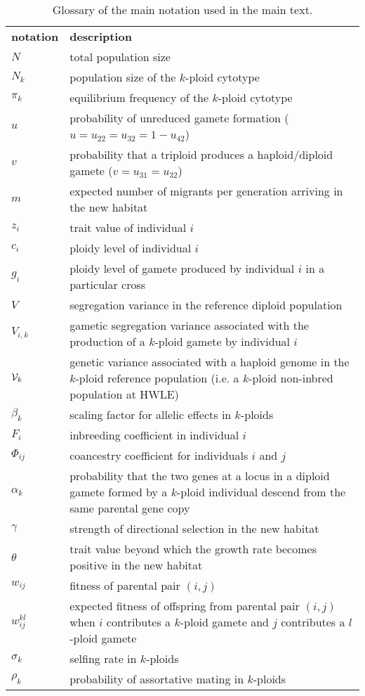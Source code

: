 \documentclass[12pt,a4paper]{article}
\begin{document}
\begin{table}[t]
\caption{Glossary of the main notation used in the main text.
} \label{tbl:glossary}
\centering
\small
\begin{tabularx}{\linewidth}{lX}
\cline{1-2}
\textbf{notation}   & \textbf{description}   \\ \cline{1-2}
$N$ & total population size\\
$N_k$ & population size of the $k$-ploid cytotype \\
$\pi_k$ & equilibrium frequency of the $k$-ploid cytotype \\
$u$ & probability of unreduced gamete formation ($u=u_{22}=u_{32}=1-u_{42}$)\\
$v$ & probability that a triploid produces a haploid/diploid gamete
  ($v=u_{31}=u_{32}$)\\
$m$ & expected number of migrants per generation arriving in the new habitat \\
$z_i$ & trait value of individual $i$ \\
$c_i$ & ploidy level of individual $i$ \\
$g_i$ & ploidy level of gamete produced by individual $i$ in a particular cross\\
$V$ & segregation variance in the reference diploid population \\
$V_{i,k}$ & gametic segregation variance associated with the production of a
  $k$-ploid gamete by individual $i$ \\
$\mathcal{V}_k$ & genetic variance associated with a haploid genome in the $k$-ploid
  reference population (i.e. a $k$-ploid non-inbred population at HWLE) \\
$\beta_{k}$ & scaling factor for allelic effects in $k$-ploids \\
$F_i$ & inbreeding coefficient in individual $i$ \\
$\Phi_{ij}$ & coancestry coefficient for individuals $i$ and $j$ \\
$\alpha_k$ & probability that the two genes at a locus in a diploid gamete
  formed by a $k$-ploid individual descend from the same parental gene copy\\
$\gamma$ & strength of directional selection in the new habitat\\
$\theta$ & trait value beyond which the growth rate becomes positive in the new
habitat \\ $w_{ij}$ & fitness of parental pair $(i,j)$ \\
$w_{ij}^{kl}$ & expected fitness of offspring from parental pair $(i,j)$ when
$i$ contributes a $k$-ploid gamete and $j$ contributes a $l$-ploid gamete \\
$\sigma_k$ & selfing rate in $k$-ploids \\
$\rho_k$ & probability of assortative mating in $k$-ploids \\
\cline{1-2}
\end{tabularx}%
\end{table}
\end{document}

